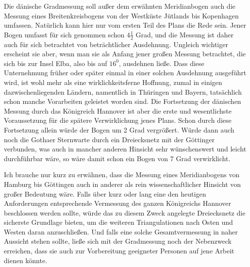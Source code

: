 Die dänische Gradmessung soll außer dem erwähnten Meridianbogen auch die Messung eines Breitenkreisbogens von der Westküste Jütlands bis Kopenhagen umfassen. Natürlich kann hier nur vom ersten Teil des Plans die Rede sein. Jener Bogen umfasst für sich genommen schon \(4\frac12\) Grad, und die Messung ist daher auch für sich betrachtet von beträchtlicher Ausdehnung. Ungleich wichtiger erscheint sie aber, wenn man sie als Anfang jener großen Messung betrachtet, die sich bis zur Insel Elba, also bis auf \(16^0\), ausdehnen ließe. Dass diese Unternehmung früher oder später einmal in einer solchen Ausdehnung ausgeführt wird, ist wohl mehr als eine wirklichkeitsferne Hoffnung, zumal in einigen dazwischenliegenden Ländern, namentlich in Thüringen und Bayern, tatsächlich schon manche Vorarbeiten geleistet worden sind. Die Fortsetzung der dänischen Messung durch das Königreich Hannover ist aber die erste und wesentlichste Voraussetzung für die spätere Verwirklichung jenes Plans. Schon durch diese Fortsetzung allein würde der Bogen um 2 Grad vergrößert. Würde dann auch noch die Gothaer Sternwarte durch ein Dreiecksnetz mit der Göttinger verbunden, was auch in mancher anderen Hinsicht sehr wünschenswert und leicht durchführbar wäre, so wäre damit schon ein Bogen von 7 Grad verwirklicht.

Ich brauche nur kurz zu erwähnen, dass die Messung eines Meridianbogens von Hamburg bis Göttingen auch in anderer als rein wissenschaftlicher Hinsicht von großer Bedeutung wäre. Falls über kurz oder lang eine den heutigen Anforderungen entsprechende Vermessung des ganzen Königreichs Hannover beschlossen werden sollte, würde das zu diesem Zweck angelegte Dreiecksnetz die sicherste Grundlage bieten, um die weiteren Triangulationen nach Osten und Westen daran anzuschließen. Und falls eine solche Gesamtvermessung in naher Aussicht stehen sollte, ließe sich mit der Gradmessung noch der Nebenzweck erreichen, dass sie auch zur Vorbereitung geeigneter Personen auf jene Arbeit dienen könnte.
